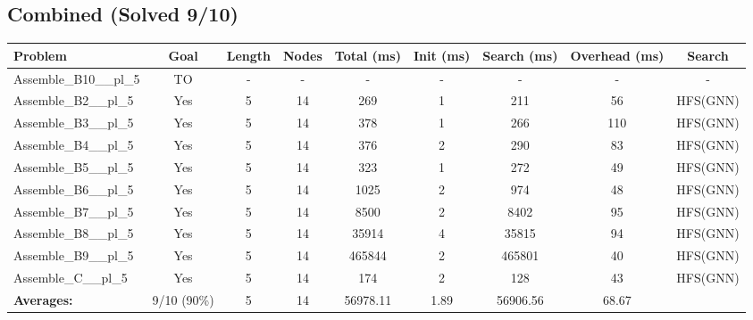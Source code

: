 \documentclass{article}
\begin{document}
\subsection*{Combined (Solved 9/10)}
\begin{tabular}{lcccccccc}
\toprule
Problem & Goal & Length & Nodes & Total (ms) & Init (ms) & Search (ms) & Overhead (ms) & Search \\
\midrule
Assemble\_B10\_\_pl\_5 & TO & - & - & - & - & - & - & - \\
Assemble\_B2\_\_pl\_5 & Yes & 5 & 14 & 269 & 1 & 211 & 56 & HFS(GNN) \\
Assemble\_B3\_\_pl\_5 & Yes & 5 & 14 & 378 & 1 & 266 & 110 & HFS(GNN) \\
Assemble\_B4\_\_pl\_5 & Yes & 5 & 14 & 376 & 2 & 290 & 83 & HFS(GNN) \\
Assemble\_B5\_\_pl\_5 & Yes & 5 & 14 & 323 & 1 & 272 & 49 & HFS(GNN) \\
Assemble\_B6\_\_pl\_5 & Yes & 5 & 14 & 1025 & 2 & 974 & 48 & HFS(GNN) \\
Assemble\_B7\_\_pl\_5 & Yes & 5 & 14 & 8500 & 2 & 8402 & 95 & HFS(GNN) \\
Assemble\_B8\_\_pl\_5 & Yes & 5 & 14 & 35914 & 4 & 35815 & 94 & HFS(GNN) \\
Assemble\_B9\_\_pl\_5 & Yes & 5 & 14 & 465844 & 2 & 465801 & 40 & HFS(GNN) \\
Assemble\_C\_\_pl\_5 & Yes & 5 & 14 & 174 & 2 & 128 & 43 & HFS(GNN) \\
\textbf{Averages:} & 9/10 (90\%) & 5 & 14 & 56978.11 & 1.89 & 56906.56 & 68.67 & \\
\bottomrule
\end{tabular}
\\[0.7cm]
\end{document}
